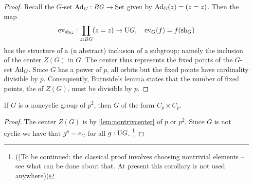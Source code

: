 \begin{proof}
  Recall the $G$-set $\Ad_G:\BG\to\Set$ given by $\Ad_G(z)=(z=z)$.  
Then the map  
$$\ev_{\sh_G}:\prod_{z:\BG}(z=z)\to\USym G,\quad \ev_G(f)=f(\sh_G)$$  
has the structure of a (n abstract) inclusion of a subgroup; namely the inclusion of the center $Z(G)$ in $G$.  
The center thus represents the fixed points of the $G$-set $\Ad_G$.  
Since $G$ has \gporder a power of $p$, all orbits but the fixed points have cardinality divisible by $p$.  
Consequently, Burnside's lemma states that the number of fixed points, \ie the \gporder of $Z(G)$, must be divisible by $p$.
\end{proof}
\begin{corollary}
  \label{cor:orderpsquaredgroups}
  If $G$ is a noncyclic group of \gporder $p^2$, then $G$ of the form $C_p\times C_p$.
\end{corollary}
\begin{proof}
  The center $Z(G)$ is by \cref{lem:nontrivcenter} of \gporder $p$ or $p^2$.
  Since $G$ is not cyclic we have that $g^p=e_G$ for all $g:\mathrm{U} G$.    
\footnote{((To be continued: the classical proof involves choosing nontrivial elements  -- see what can be done about that.  At present this corollary is not used anywhere))}
\end{proof}
